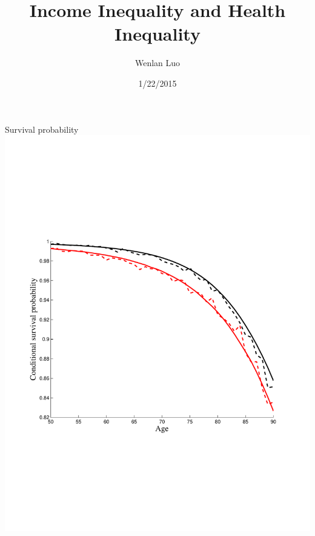 \documentclass[svgnames]{beamer}
\begin{document}
\begin{frame}
\title{Income Inequality and Health Inequality}
\author{Wenlan Luo}
\date{1/22/2015}
\maketitle
\end{frame}

\begin{frame}{Survival probability}
\includegraphics[width=1\textwidth, trim=0cm 0cm 0cm 5cm, clip=true]{graph/PsiModelVsData.pdf}
\end{frame}
\end{document}
